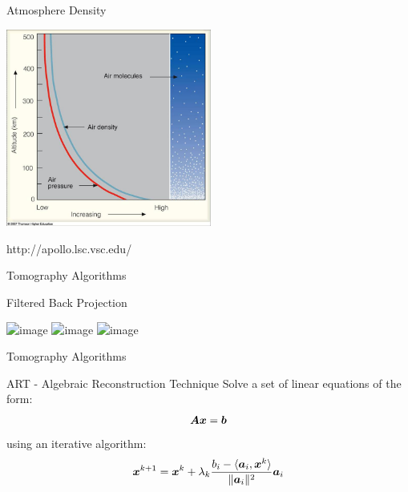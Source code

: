 \documentclass[compress,red,12pt]{beamer}
\begin{document}

\begin{frame}[label=air-density]{Atmosphere Density}
  \begin{center}
    \includegraphics[height=6.5cm]{images/vert_dist.jpg}
  \end{center}    
  \begin{flushright}
    {\tiny http://apollo.lsc.vsc.edu/}  \hyperlink{settings<4>}{}
  \end{flushright}
\end{frame}


\begin{frame}[label=tomo-algo]{Tomography Algorithms}
  \begin{block}{Filtered Back Projection}
  \end{block}

  \begin{center}
    \includegraphics<1>[height=6.5cm]{images/radon.jpg}
    \includegraphics<2>[height=6.5cm]{images/radon_inv.jpg}
    \includegraphics<3>[height=6.5cm]{images/radon_inv_filt.jpg}
  \end{center}
\end{frame}

\begin{frame}{Tomography Algorithms}
  \begin{block}{ART - Algebraic Reconstruction Technique}
    Solve a set of linear equations of the form: \\
    \begin{equation*}
      \bm{A} \bm{x} = \bm{b}
    \end{equation*}
    using an iterative algorithm: \\
    \begin{equation*}
      \bm{x}^{k+1} = \bm{x}^{k} + \lambda_k \frac{b_{i} - \langle \bm{a}_{i}, \bm{x}^{k} \rangle}{\lVert \bm{a}_{i} \rVert^2} \bm{a}_{i}
    \end{equation*}
  \end{block}

\end{frame}
\end{document}
